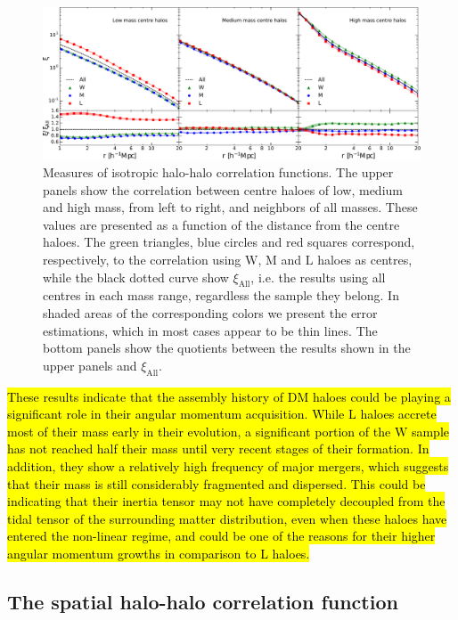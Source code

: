 \documentclass[fleqn,usenatbib]{mnras}
\newcommand{\Wh}{\mathrm{W}}
\newcommand{\Lh}{\mathrm{L}}
\newcommand{\Mh}{\mathrm{M}}
\begin{document}
\begin{figure}
	\includegraphics[width=2\columnwidth]{400Mpc_figs/panel_M123_iso_color.pdf}
    \caption{Measures of isotropic halo-halo correlation functions. The upper panels show the correlation between centre haloes of low, medium and high mass, from left to right, and neighbors of all masses. These values are presented as a function of the distance from the centre haloes. The green triangles, blue circles and red squares correspond, respectively, to the correlation using $\Wh$, $\Mh$ and $\Lh$ haloes as centres, while the black dotted curve show $\xi_\mathrm{All}$, i.e. the results using all centres in each mass range, regardless the sample they belong. In shaded areas of the corresponding colors we present the error estimations, which in most cases appear to be thin lines. The bottom panels show the quotients between the results shown in the upper panels and $\xi_\mathrm{All}$.}
    \label{fig:iso_M123}
\end{figure}

\hl{These results indicate that the assembly history of DM haloes could be playing a significant role in their angular momentum acquisition. While $\Lh$ haloes accrete most of their mass early in their evolution, a significant portion of the $\Wh$ sample has not reached half their mass until very recent stages of their formation. In addition, they show a relatively high frequency of major mergers, which suggests that their mass is still considerably fragmented and dispersed. This could be indicating that their inertia tensor may not have completely decoupled from the tidal tensor of the surrounding matter distribution, even when these haloes have entered the non-linear regime, and could be one of the reasons for their higher angular momentum growths in comparison to $\Lh$ haloes.}

\subsection{The spatial halo-halo correlation function}
\end{document}
